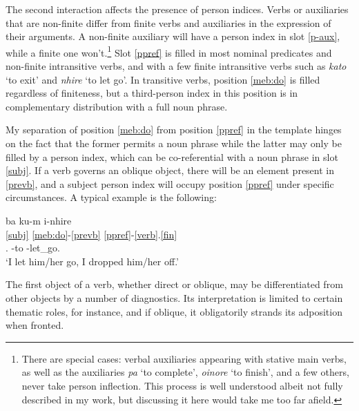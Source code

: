 \documentclass[output=paper]{langscibook}
\begin{document}
The second interaction affects the presence of person indices. Verbs or auxiliaries that are non-finite differ from finite verbs and auxiliaries in the expression of their arguments. A non-finite auxiliary will have a person index in slot \ref{p-aux}, while a finite one won't.\footnote{There are special cases: verbal auxiliaries appearing with stative main verbs, as well as the auxiliaries {\em pa} `to complete', {\em oinore} `to finish', and a few others, never take person inflection. This process is well understood albeit not fully described in my work, but discussing it here would take me too far afield.} Slot \ref{ppref} is filled in most nominal predicates and non-finite intransitive verbs, and with a few finite intransitive verbs such as {\em kato} `to exit' and {\em nhire} `to let go'. In transitive verbs, position \ref{meb:do} is filled regardless of finiteness, but a third-person index in this position is in complementary distribution with a full noun phrase.


My separation of position \ref{meb:do} from position \ref{ppref} in the template hinges on the fact that the former permits a noun phrase while the latter may only be filled by a person index, which can be co-referential with a noun phrase in slot \ref{subj}. If a verb governs an oblique object, there will be an element present in \ref{prevb}, and a subject person index will occupy position \ref{ppref} under specific circumstances. A typical example is the following:

\ea\label{maire}\glll ba ku-m i-nhire\\
          \ref{subj} \ref{meb:do}-\ref{prevb} \ref{ppref}-\ref{verb}.\ref{fin}\\
    \First.\Nom{} \Third\Acc{}-to \First-let\_go.\Fin{}\\
  \glt `I let him/her go, I dropped him/her off.'
\z


The first object of a verb, whether direct or oblique, may be differentiated from other objects by a number of diagnostics. Its interpretation is limited to certain thematic roles, for instance, and if oblique, it obligatorily strands its adposition when fronted. %
\end{document}
